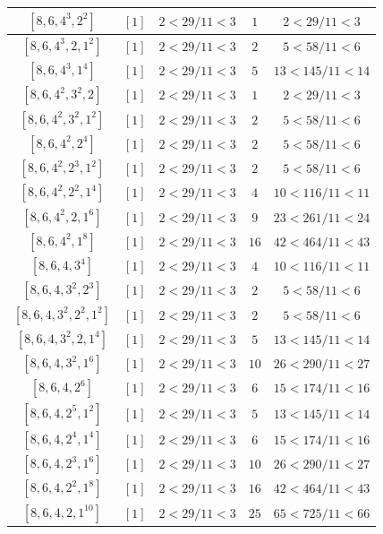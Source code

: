 \documentclass{article}%
\begin{document}
\begin{center}
\begin{longtable}{||c|c|c|c|c||}
$[8, 6, 4^{3}, 2^{2}]$ & $[1]$ & $2 < 29/11 < 3$ & $1$ & $2 < 29/11 < 3$ \\ \hline 
$[8, 6, 4^{3}, 2, 1^{2}]$ & $[1]$ & $2 < 29/11 < 3$ & $2$ & $5 < 58/11 < 6$ \\ \hline 
$[8, 6, 4^{3}, 1^{4}]$ & $[1]$ & $2 < 29/11 < 3$ & $5$ & $13 < 145/11 < 14$ \\ \hline 
$[8, 6, 4^{2}, 3^{2}, 2]$ & $[1]$ & $2 < 29/11 < 3$ & $1$ & $2 < 29/11 < 3$ \\ \hline 
$[8, 6, 4^{2}, 3^{2}, 1^{2}]$ & $[1]$ & $2 < 29/11 < 3$ & $2$ & $5 < 58/11 < 6$ \\ \hline 
$[8, 6, 4^{2}, 2^{4}]$ & $[1]$ & $2 < 29/11 < 3$ & $2$ & $5 < 58/11 < 6$ \\ \hline 
$[8, 6, 4^{2}, 2^{3}, 1^{2}]$ & $[1]$ & $2 < 29/11 < 3$ & $2$ & $5 < 58/11 < 6$ \\ \hline 
$[8, 6, 4^{2}, 2^{2}, 1^{4}]$ & $[1]$ & $2 < 29/11 < 3$ & $4$ & $10 < 116/11 < 11$ \\ \hline 
$[8, 6, 4^{2}, 2, 1^{6}]$ & $[1]$ & $2 < 29/11 < 3$ & $9$ & $23 < 261/11 < 24$ \\ \hline 
$[8, 6, 4^{2}, 1^{8}]$ & $[1]$ & $2 < 29/11 < 3$ & $16$ & $42 < 464/11 < 43$ \\ \hline 
$[8, 6, 4, 3^{4}]$ & $[1]$ & $2 < 29/11 < 3$ & $4$ & $10 < 116/11 < 11$ \\ \hline 
$[8, 6, 4, 3^{2}, 2^{3}]$ & $[1]$ & $2 < 29/11 < 3$ & $2$ & $5 < 58/11 < 6$ \\ \hline 
$[8, 6, 4, 3^{2}, 2^{2}, 1^{2}]$ & $[1]$ & $2 < 29/11 < 3$ & $2$ & $5 < 58/11 < 6$ \\ \hline 
$[8, 6, 4, 3^{2}, 2, 1^{4}]$ & $[1]$ & $2 < 29/11 < 3$ & $5$ & $13 < 145/11 < 14$ \\ \hline 
$[8, 6, 4, 3^{2}, 1^{6}]$ & $[1]$ & $2 < 29/11 < 3$ & $10$ & $26 < 290/11 < 27$ \\ \hline 
$[8, 6, 4, 2^{6}]$ & $[1]$ & $2 < 29/11 < 3$ & $6$ & $15 < 174/11 < 16$ \\ \hline 
$[8, 6, 4, 2^{5}, 1^{2}]$ & $[1]$ & $2 < 29/11 < 3$ & $5$ & $13 < 145/11 < 14$ \\ \hline 
$[8, 6, 4, 2^{4}, 1^{4}]$ & $[1]$ & $2 < 29/11 < 3$ & $6$ & $15 < 174/11 < 16$ \\ \hline 
$[8, 6, 4, 2^{3}, 1^{6}]$ & $[1]$ & $2 < 29/11 < 3$ & $10$ & $26 < 290/11 < 27$ \\ \hline 
$[8, 6, 4, 2^{2}, 1^{8}]$ & $[1]$ & $2 < 29/11 < 3$ & $16$ & $42 < 464/11 < 43$ \\ \hline 
$[8, 6, 4, 2, 1^{10}]$ & $[1]$ & $2 < 29/11 < 3$ & $25$ & $65 < 725/11 < 66$ \\ \hline 

\end{longtable}
\end{center}
\end{document}
